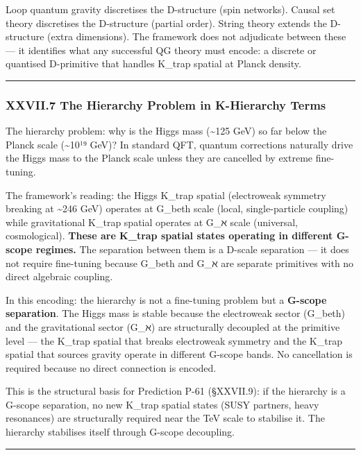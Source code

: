 \documentclass[12pt,a4paper]{article}
\begin{document}
Loop quantum gravity discretises the D-structure (spin networks). Causal set theory discretises the D-structure (partial order). String theory extends the D-structure (extra dimensions). The framework does not adjudicate between these --- it identifies what any successful QG theory must encode: a discrete or quantised D-primitive that handles K\_trap spatial at Planck density.

\begin{center}
\rule{0.5\textwidth}{0.4pt}
\end{center}

\subsubsection{XXVII.7 The Hierarchy Problem in K-Hierarchy Terms}

The hierarchy problem: why is the Higgs mass (\textasciitilde{}125 GeV) so far below the Planck scale (\textasciitilde{}10¹⁹ GeV)? In standard QFT, quantum corrections naturally drive the Higgs mass to the Planck scale unless they are cancelled by extreme fine-tuning.

The framework's reading: the Higgs K\_trap spatial (electroweak symmetry breaking at \textasciitilde{}246 GeV) operates at G\_beth scale (local, single-particle coupling) while gravitational K\_trap spatial operates at G\_ℵ scale (universal, cosmological). \textbf{These are K\_trap spatial states operating in different G-scope regimes.} The separation between them is a D-scale separation --- it does not require fine-tuning because G\_beth and G\_ℵ are separate primitives with no direct algebraic coupling.

In this encoding: the hierarchy is not a fine-tuning problem but a \textbf{G-scope separation}. The Higgs mass is stable because the electroweak sector (G\_beth) and the gravitational sector (G\_ℵ) are structurally decoupled at the primitive level --- the K\_trap spatial that breaks electroweak symmetry and the K\_trap spatial that sources gravity operate in different G-scope bands. No cancellation is required because no direct connection is encoded.

This is the structural basis for Prediction P-61 (§XXVII.9): if the hierarchy is a G-scope separation, no new K\_trap spatial states (SUSY partners, heavy resonances) are structurally required near the TeV scale to stabilise it. The hierarchy stabilises itself through G-scope decoupling.

\begin{center}
\rule{0.5\textwidth}{0.4pt}
\end{center}
\end{document}
